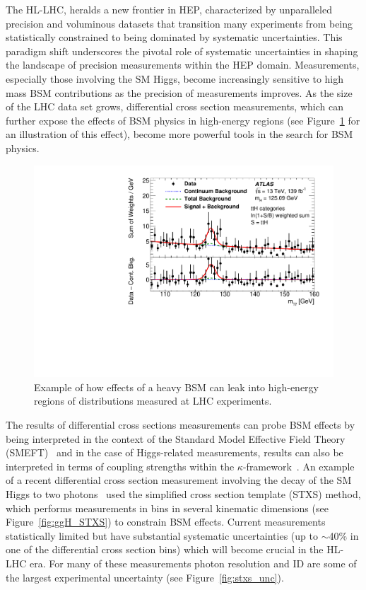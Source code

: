 \documentclass[letter, USenglish, 11pt, subfigure]{article}
\begin{document}
The HL-LHC, heralds a new frontier in HEP, characterized by unparalleled precision and voluminous datasets that transition many experiments from being statistically constrained to being dominated by systematic uncertainties. This paradigm shift underscores the pivotal role of systematic uncertainties in shaping the landscape of precision measurements within the HEP domain. 
Measurements, especially those involving the SM Higgs, become increasingly sensitive to high mass BSM contributions as the precision of measurements improves. As the size of the LHC data set grows, differential cross section measurements, which can further expose the effects of BSM physics in high-energy regions (see Figure~\ref{fig:SMEFT_highmass} for an illustration of this effect), become more powerful tools in the search for BSM physics.
\begin{figure}
  \centering
  \includegraphics[width=\linewidth]{figures/tth_myy.pdf}
  \caption{\label{fig:SMEFT_highmass} Example of how effects of a heavy BSM can leak into high-energy regions of distributions measured at LHC experiments.}
\end{figure}
The results of differential cross sections measurements can probe BSM effects by being interpreted in the context of the Standard Model Effective Field Theory (SMEFT)~\cite{Buchmuller:1985jz,Grzadkowski:2010es,SMEFTsim3} and in the case of Higgs-related measurements, results can also be interpreted in terms of coupling strengths within the $\kappa$-framework~\cite{deFlorian:2016spz}. An example of a recent differential cross section measurement involving the decay of the SM Higgs to two photons~\cite{ATLAS_STXS} used the simplified cross section template (STXS) method, which performs measurements in bins in several kinematic dimensions (see Figure~\ref{fig:ggH_STXS}) to constrain BSM effects. Current measurements statistically limited but have substantial systematic uncertainties (up to $\sim$40\% in one of the differential cross section bins) which will become crucial in the HL-LHC era. For many of these measurements photon resolution and ID are some of the largest experimental uncertainty (see Figure~\ref{fig:stxs_unc}). 
\end{document}
